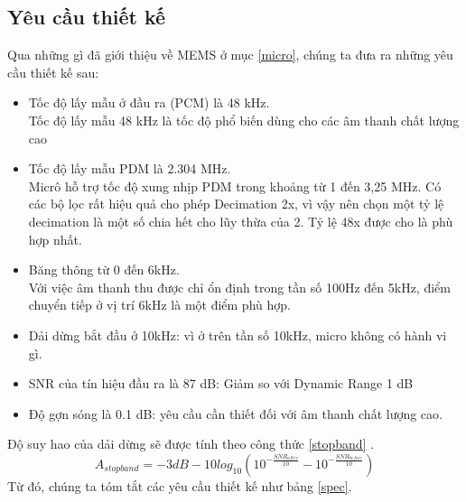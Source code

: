 \subsection{Yêu cầu thiết kế} \label{spec_muc}
Qua những gì đã giới thiệu về MEMS ở mục \ref{micro}, chúng ta đưa ra những yêu cầu thiết kế sau:
\begin{itemize}
    \item Tốc độ lấy mẫu ở đầu ra (PCM) là 48 kHz.\\
    Tốc độ lấy mẫu 48 kHz là tốc độ phổ biến dùng cho các âm thanh chất lượng cao
    \item Tốc độ lấy mẫu PDM là 2.304 MHz.\\
    Micrô hỗ trợ tốc độ xung nhịp PDM trong khoảng từ 1 đến 3,25 MHz. Có các bộ lọc rất hiệu quả cho phép Decimation 2x, vì vậy nên chọn một tỷ lệ decimation là một số chia hết cho lũy thừa của 2. Tỷ lệ 48x được cho là phù hợp nhất.
    \item Băng thông từ 0 đến 6kHz.\\
    Với việc âm thanh thu được chỉ ổn định trong tần số 100Hz đến 5kHz, điểm chuyển tiếp ở vị trí 6kHz là một điểm phù hợp.
    \item Dải dừng bắt đầu ở 10kHz: vì ở trên tần số 10kHz, micro không có hành vi gì.
    \item SNR của tín hiệu đầu ra là 87 dB: Giảm so với Dynamic Range 1 dB
    \item Độ gợn sóng là 0.1 dB: yêu cầu cần thiết đối với âm thanh chất lượng cao.
\end{itemize}
Độ suy hao của dải dừng sẽ được tính theo công thức \ref{stopband} \cite{pdm2pcm}.
\begin{equation} \label{stopband}
    A_{stop band} = -3dB - 10log_{10}{(10^{-\displaystyle\frac{SNR_{after}}{10}}-10^{-\displaystyle\frac{SNR_{before}}{10}})}
\end{equation}
Từ đó, chúng ta tóm tắt các yêu cầu thiết kế như bảng \ref{spec}.

